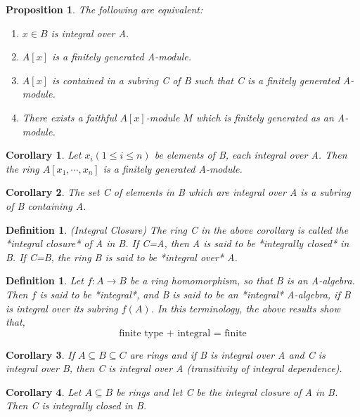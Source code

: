 \documentclass[]{report}
\newtheorem{prop}[theorem]{Proposition}
\newtheorem{corollary}{Corollary}[theorem]
\newtheorem{defn}[theorem]{Definition}
\begin{document}
\begin{prop}
    The following are equivalent:
    \begin{enumerate}
        \item $x\in B$ is integral over A.
        \item $A[x]$ is a finitely generated A-module.
        \item $A[x]$ is contained in a subring C of B such that C is a finitely generated A-module.
        \item There exists a faithful $A[x]$-module $M$ which is finitely generated as an A-module.
    \end{enumerate}
\end{prop}

\begin{corollary}
    Let $x_i (1 \leq i \leq n)$ be elements of B, each integral over A. Then the ring $A[x_1,\cdots,x_n]$ is a finitely generated A-module.
\end{corollary}

\begin{corollary}
    The set C of elements in B which are integral over A is a subring of B containing A. 
\end{corollary}

\begin{defn}
    (Integral Closure) The ring C in the above corollary is called the *integral closure* of A in B. If C=A, then A is said to be *integrally closed* in B. If C=B, the ring B is said to be *integral over* A.
\end{defn}

\begin{defn}
    Let $f:A\rightarrow B$ be a ring homomorphism, so that B is an A-algebra. Then $f$ is said to be *integral*, and B is said to be an *integral* A-algebra, if B is integral over its subring $f(A)$. In this terminology, the above results show that,
$$\text{finite type + integral = finite}$$
\end{defn}

\begin{corollary}
    If $A\subseteq B \subseteq C$ are rings and if B is integral over A and C is integral over B, then C is integral over A (transitivity of integral dependence). 
\end{corollary}

\begin{corollary}
    Let $A\subseteq B$ be rings and let C be the integral closure of A in B. Then C is integrally closed in B. 
\end{corollary}
\end{document}
